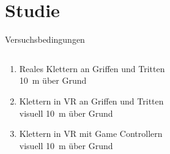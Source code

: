 \section{Studie}

\begin{frame}{Versuchsbedingungen}
\begin{columns}
	\begin{column}{0.5\textwidth}
		\begin{enumerate}[label=\textbf\textcolor{tertiary}{\Alph*}]
			\item Reales Klettern an Griffen und Tritten
			\\\textcolor{source}{\SI{10}{\meter} über Grund}
			\item Klettern in \gls{VR} an Griffen und Tritten
			\\\textcolor{source}{visuell \SI{10}{\meter} über Grund}
			\item Klettern in \gls{VR} mit Game Controllern
			\\\textcolor{source}{visuell \SI{10}{\meter} über Grund}
		\end{enumerate}
	\end{column}
	\begin{column}{0.5\textwidth}
		\begin{center}
			\vspace*{-15mm}

\end{center}
\end{column}
\end{columns}
\end{frame}
